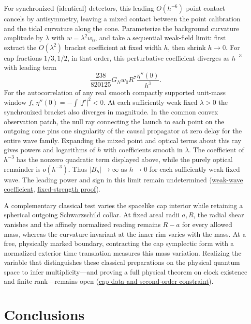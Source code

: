 \documentclass[10pt,a4paper]{article}
\numberwithin{equation}{section}
\newcommand{\repo}[2]{\href{https://github.com/sprajs/quantum-gravity/blob/main/#1}{#2}}
\begin{document}
For synchronized (identical) detectors, this leading $O(h^{-6})$ point contact cancels by antisymmetry, leaving a mixed contact between the point calibration and the tidal curvature along the cone. Parameterize the background curvature amplitude by $\lambda$ with $w=\lambda^2w_0$, and take a sequential weak-field limit: first extract the $O(\lambda^2)$ bracket coefficient at fixed width $h$, then shrink $h\to0$. For cap fractions $1/3,1/2$, in that order, this perturbative coefficient diverges as $h^{-3}$ with leading term
\[
     \frac{238}{820125}G_N w_0 R^7\frac{\eta''(0)}{h^3}.
\]
For the autocorrelation of any real smooth compactly supported unit-mass window $f$, $\eta''(0)=-\int |f'|^2<0$. At each sufficiently weak fixed $\lambda>0$ the synchronized bracket also diverges in magnitude. In the common convex observation patch, the null ray connecting the launch to each point on the outgoing cone pins one singularity of the causal propagator at zero delay for the entire wave family. Expanding the mixed point and optical terms about this ray gives powers and logarithms of $h$ with coefficients smooth in $\lambda$. The coefficient of $h^{-3}$ has the nonzero quadratic term displayed above, while the purely optical remainder is $o(h^{-3})$. Thus $|B_h|\to\infty$ as $h\to0$ for each sufficiently weak fixed wave. The leading power and sign in this limit remain undetermined (\repo{audit/synchronized-contact.md}{weak-wave coefficient}, \repo{audit/fixed-strength-contact.md}{fixed-strength proof}).

A complementary classical test varies the spacelike cap interior while retaining a spherical outgoing Schwarzschild collar. At fixed areal radii $a,R$, the radial shear vanishes and the affinely normalized reading remains $R-a$ for every allowed mass, whereas the curvature invariant at the inner rim varies with the mass. At a free, physically marked boundary, contracting the cap symplectic form with a normalized exterior time translation measures this mass variation. Realizing the variable that distinguishes these classical preparations on the physical quantum space to infer multiplicity---and proving a full physical theorem on clock existence and finite rank---remains open (\repo{audit/cap-interior-algebra.md}{cap data and second-order constraint}).

\section{Conclusions}
\label{sec:conclusions}
\end{document}
